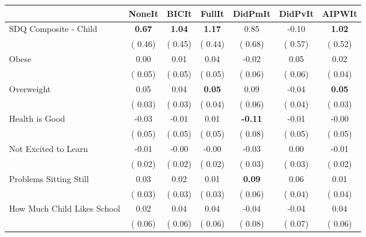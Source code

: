 \begin{tabular}{l c c c c c c}
\toprule
 & NoneIt & BICIt & FullIt & DidPmIt & DidPvIt & AIPWIt \\
\midrule
SDQ Composite - Child & \textbf{      0.67 } & \textbf{      1.04 } & \textbf{      1.17 } &      0.85 &     -0.10 & \textbf{     1.02} \\
& (     0.46) & (     0.45) & (     0.44) & (     0.68) & (     0.57) & (     0.52) \\
Obese &      0.00 &      0.01 &      0.04 &     -0.02 &      0.05 &      0.02 \\
& (     0.05) & (     0.05) & (     0.05) & (     0.06) & (     0.06) & (     0.04) \\
Overweight &      0.05 &      0.04 & \textbf{      0.05 } &      0.09 &     -0.04 & \textbf{     0.05} \\
& (     0.03) & (     0.03) & (     0.04) & (     0.06) & (     0.04) & (     0.03) \\
Health is Good &     -0.03 &     -0.01 &      0.01 & \textbf{     -0.11 } &     -0.01 &     -0.00 \\
& (     0.05) & (     0.05) & (     0.05) & (     0.08) & (     0.05) & (     0.05) \\
Not Excited to Learn &     -0.01 &     -0.00 &     -0.00 &     -0.03 &      0.00 &     -0.01 \\
& (     0.02) & (     0.02) & (     0.02) & (     0.03) & (     0.03) & (     0.02) \\
Problems Sitting Still &      0.03 &      0.02 &      0.01 & \textbf{      0.09 } &      0.06 &      0.01 \\
& (     0.03) & (     0.03) & (     0.03) & (     0.06) & (     0.04) & (     0.04) \\
How Much Child Likes School &      0.02 &      0.04 &      0.04 &     -0.04 &     -0.04 &      0.04 \\
& (     0.06) & (     0.06) & (     0.06) & (     0.08) & (     0.07) & (     0.06) \\
\bottomrule
\end{tabular}
